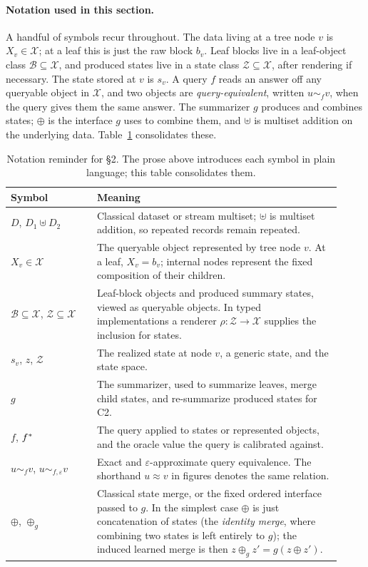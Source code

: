 \paragraph{Notation used in this section.}
A handful of symbols recur throughout. The data living at a tree node
\(v\) is \(X_v\in\mathcal{X}\); at a leaf this is just the raw block
\(b_v\). Leaf blocks live in a leaf-object class
\(\mathcal{B}\subseteq\mathcal{X}\), and produced states live in a
state class \(\mathcal{Z}\subseteq\mathcal{X}\), after rendering if
necessary. The state stored at \(v\) is \(s_v\). A query \(f\) reads an
answer off any queryable object in \(\mathcal{X}\), and two objects are
\emph{query-equivalent}, written \(u\sim_f v\), when the query gives
them the same answer. The summarizer \(g\) produces and combines
states; \(\oplus\) is the interface \(g\) uses to combine them, and
\(\uplus\) is multiset addition on the underlying data.
Table~\ref{tab:v7-section2-notation} consolidates these.

\begin{table}[t]
\centering
\small
\begin{tabular}{@{}p{0.24\linewidth}p{0.68\linewidth}@{}}
\toprule
Symbol & Meaning \\
\midrule
\(D\), \(D_1\uplus D_2\) &
Classical dataset or stream multiset; \(\uplus\) is multiset addition,
so repeated records remain repeated. \\
\(X_v\in\mathcal X\) &
The queryable object represented by tree node \(v\). At a leaf,
\(X_v=b_v\); internal nodes represent the fixed composition of their
children. \\
\(\mathcal B\subseteq\mathcal X\), \(\mathcal Z\subseteq\mathcal X\) &
Leaf-block objects and produced summary states, viewed as queryable
objects. In typed implementations a renderer
\(\rho:\mathcal Z\to\mathcal X\) supplies the inclusion for states. \\
\(s_v\), \(z\), \(\mathcal Z\) &
The realized state at node \(v\), a generic state, and the state space. \\
\(g\) &
The summarizer, used to summarize leaves, merge child states, and
re-summarize produced states for C2. \\
\(f\), \(f^\ast\) &
The query applied to states or represented objects, and the oracle
value the query is calibrated against. \\
\(u\sim_f v\), \(u\sim_{f,\varepsilon}v\) &
Exact and \(\varepsilon\)-approximate query equivalence. The shorthand
\(u\approx v\) in figures denotes the same relation. \\
\(\oplus\), \(\oplus_g\) &
Classical state merge, or the fixed ordered interface passed to \(g\).
In the simplest case \(\oplus\) is just concatenation of states (the
\emph{identity merge}, where combining two states is left entirely to
\(g\)); the induced learned merge is then
\(z\oplus_g z'=g(z\oplus z')\). \\
\bottomrule
\end{tabular}
\caption{Notation reminder for \S2. The prose above introduces each
symbol in plain language; this table consolidates them.}
\label{tab:v7-section2-notation}
\end{table}

